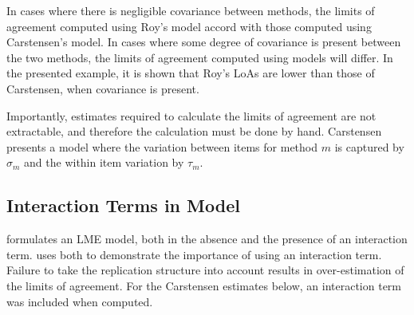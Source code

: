 \documentclass[12pt, a4paper]{report}
\theoremstyle{plain}
\theoremstyle{definition}
\theoremstyle{remark}
\begin{document}
	
In cases where there is negligible covariance between methods, the limits of agreement computed using Roy's model accord with those computed using Carstensen's model. In cases where some degree of
covariance is present between the two methods, the limits of agreement computed using models will differ. In the presented
example, it is shown that Roy's LoAs are lower than those of Carstensen, when covariance is present.

Importantly, estimates required to calculate the limits of agreement are not extractable, and therefore the calculation must
be done by hand.
Carstensen presents a model where the variation between items for
method $m$ is captured by $\sigma_m$ and the within item variation
by $\tau_m$.



	


	\subsection{Interaction Terms in Model}
	\citet{BXC2008} formulates an LME model, both in the absence and the presence of an interaction term.\citet{bxc} uses both to demonstrate the importance of using an interaction term. Failure to take the replication structure into
	account results in over-estimation of the limits of agreement. For the Carstensen estimates below, an interaction term was included when computed.
	
	
	
\end{document}
